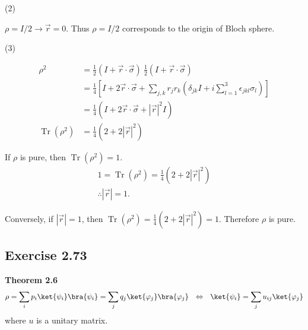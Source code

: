 \documentclass[a4paper,12pt]{article}
\DeclareMathOperator{\Tr}{Tr}
\begin{document}
\vspace{5mm}
(2)

$\rho = I / 2 \rightarrow \vec{r}  = 0$. Thus  $\rho = I / 2$ corresponds to the origin of Bloch sphere.

\vspace{5mm}
(3)

\begin{align*}
    \rho^2 &= \frac{1}{2} (I + \vec{r} \cdot \vec{\sigma})~ \frac{1}{2} (I + \vec{r} \cdot \vec{\sigma})\\
        &= \frac{1}{4} \left[ I + 2 \vec{r}\cdot \vec{\sigma} + \sum_{j,k}r_j r_k \left(\delta_{jk} I + i \sum_{l=1}^3 \epsilon_{jkl}\sigma_l \right)  \right]\\
        &= \frac{1}{4} \left(I + 2 \vec{r}\cdot \vec{\sigma} + |\vec{r}|^2 I \right)\\
    \Tr (\rho^2) &= \frac{1}{4} (2 + 2|\vec{r}|^2)
\end{align*}

If $\rho$ is pure, then $\Tr (\rho^2) = 1$.
\begin{align*}
   1 =  \Tr (\rho^2) = \frac{1}{4} (2 + 2|\vec{r}|^2)\\
   \therefore |\vec{r}| = 1.
\end{align*}

Conversely, if $|\vec{r}| = 1$, then $\Tr (\rho^2) = \frac{1}{4} (2 + 2|\vec{r}|^2) = 1$. Therefore $\rho$ is pure.




\subsection*{Exercise 2.73}
    \textbf{Theorem 2.6}
%
    \begin{align*}
        \rho = \sum_i p_i \ket{\psi_i}\bra{\psi_i}
            = \sum_j q_j \ket{\varphi_j}\bra{\varphi_j}
                ~~ \Leftrightarrow ~~
            \ket{\psi_i} = \sum_j u_{ij} \ket{\varphi_j}
    \end{align*}
    where $u$ is a unitary matrix.
\end{document}
